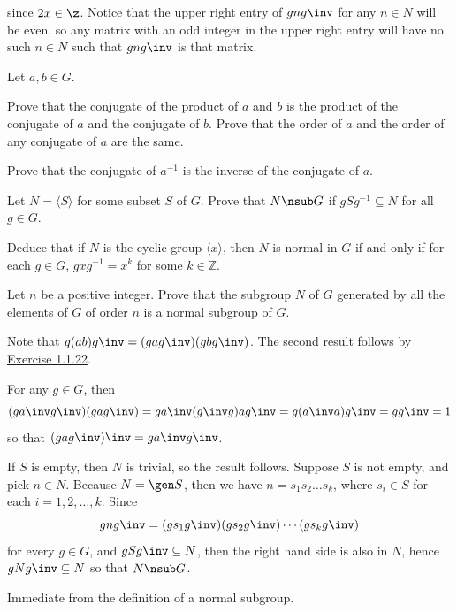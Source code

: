 \begin{problems}
\begin{solalph}
        since $2x \in \z$. Notice that the upper right entry of $gng\inv$ for any $n \in N$ will be even, so any matrix with an odd integer in the upper right entry will have no such $n \in N$ such that $gng\inv$ is that matrix.
    \end{solalph}
    \item \label{ex3.1.26} Let $a,b \in G$.
    \begin{problems}
        \item Prove that the conjugate of the product of $a$ and $b$ is the product of the conjugate of $a$ and the conjugate of $b$. Prove that the order of $a$ and the order of any conjugate of $a$ are the same.
        \item Prove that the conjugate of $a^{-1}$ is the inverse of the conjugate of $a$.
        \item Let $N = \langle S \rangle$ for some subset $S$ of $G$. Prove that $N \nsub G$ if $gSg^{-1} \subseteq N$ for all $g \in G$.
        \item Deduce that if $N$ is the cyclic group $\langle x \rangle$, then $N$ is normal in $G$ if and only if for each $g \in G$, $gxg^{-1} = x^k$ for some $k \in \mathbb{Z}$.
        \item Let $n$ be a positive integer. Prove that the subgroup $N$ of $G$ generated by all the elements of $G$ of order $n$ is a normal subgroup of $G$.
    \end{problems}
    \begin{solalph}
        \item Note that $g(ab)g\inv = (gag\inv)(gbg\inv)$. The second result follows by \hyperref[ex1.1.22]{Exercise 1.1.22}.
        \item For any $g \in G$, then
        \[(ga\inv g\inv)(gag\inv) = ga\inv (g\inv g) ag\inv = g(a\inv a)g\inv = gg\inv = 1\]
        so that $(gag\inv)\inv = ga\inv g\inv$.
        \item If $S$ is empty, then $N$ is trivial, so the result follows. Suppose $S$ is not empty, and pick $n \in N$. Because $N = \gen S$, then we have $n = s_1s_2 \ldots s_k$, where $s_i \in S$ for each $i = 1, 2, \ldots, k$. Since 
        \[gng\inv = (gs_1g\inv)(gs_2g\inv) \cdots (gs_kg\inv)\]
        for every $g \in G$, and $gSg\inv \subseteq N$, then the right hand side is also in $N$, hence $gNg\inv \subseteq N$ so that $N \nsub G$.
        \item \rightimp Immediate from the definition of a normal subgroup.
        

\end{solalph}
\end{problems}
